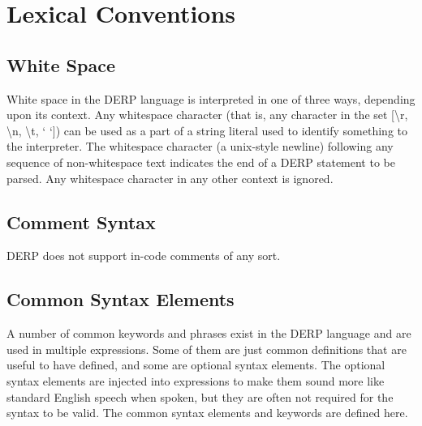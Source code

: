 \section{Lexical Conventions}

\subsection{White Space}
White space in the DERP language is interpreted in one of three ways, 
depending upon its context. Any whitespace character (that is, any 
character in the set [\textbackslash r, \textbackslash n, \textbackslash t, ‘ ‘]) can be used as a part of a 
string literal used to identify something to the interpreter. 
The whitespace character \n (a unix-style newline) following any sequence 
of non-whitespace text indicates the end of a DERP statement to be parsed. 
Any whitespace character in any other context is ignored.


\subsection{Comment Syntax}
DERP does not support in-code comments of any sort.

\subsection{Common Syntax Elements}
A number of common keywords and phrases exist in the DERP language and are 
used in multiple expressions. Some of them are just common definitions that 
are useful to have defined, and some are optional syntax elements. 
The optional syntax elements are injected into expressions to make them 
sound more like standard English speech when spoken, but they are often not 
required for the syntax to be valid. The common syntax elements and keywords 
are defined here.

\begin{center}
\end{center}
